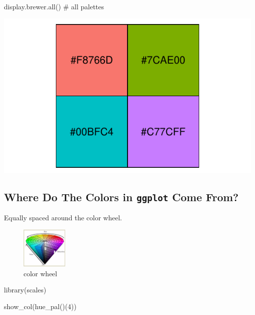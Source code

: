 \documentclass[]{article}
\newenvironment{Shaded}{}{}
\newcommand{\CommentTok}[1]{\textcolor[rgb]{0.00,0.50,0.00}{#1}}
\newcommand{\DecValTok}[1]{#1}
\newcommand{\KeywordTok}[1]{\textcolor[rgb]{0.00,0.00,1.00}{#1}}
\newcommand{\NormalTok}[1]{#1}
\begin{document}
\begin{Shaded}
\begin{Highlighting}[]
\KeywordTok{display.brewer.all}\NormalTok{() }\CommentTok{# all palettes}
\end{Highlighting}
\end{Shaded}

\includegraphics{design_files/figure-latex/unnamed-chunk-6-1.pdf}

\newpage

\hypertarget{where-do-the-colors-in-ggplot-come-from}{%
\subsection{\texorpdfstring{Where Do The Colors in \texttt{ggplot} Come
From?}{Where Do The Colors in ggplot Come From?}}\label{where-do-the-colors-in-ggplot-come-from}}

Equally spaced around the color wheel.

\begin{figure}
\centering
\includegraphics[width=0.2\textwidth,height=\textheight]{colorwheel.png}
\caption{color wheel}
\end{figure}

\begin{Shaded}
\begin{Highlighting}[]
\KeywordTok{library}\NormalTok{(scales)}

\KeywordTok{show_col}\NormalTok{(}\KeywordTok{hue_pal}\NormalTok{()(}\DecValTok{4}\NormalTok{))}
\end{Highlighting}
\end{Shaded}
\end{document}
